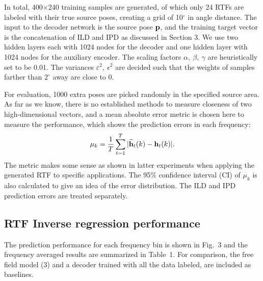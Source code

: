 \documentclass{article}
\begin{document}
In total, 400$\times$240 training samples are generated, of which only 24 RTFs are labeled with their true source poses, creating a grid of 10$^\circ$ in angle distance. The input to the decoder network is the source pose ${\bf p}$, and the training target vector is the concatenation of ILD and IPD as discussed in Section 3. We use two hidden layers each with 1024 nodes for the decoder and one hidden layer with 1024 nodes for the auxiliary encoder. The scaling factors $\alpha,~\beta,~\gamma$ are heuristically set to be 0.01. The variances $\varepsilon^2,~\epsilon^2$ are decided such that the weights of samples farther than $2^\circ$ away are close to 0.

For evaluation, 1000 extra poses are picked randomly in the specified source area. As far as we know, there is no established methods to measure closeness of two high-dimensional vectors, and a mean absolute error metric is chosen here to measure the performance, which shows the prediction errors in each frequency:
\begin{equation}\label{eq:err}
  \mu_k = \frac{1}{T}\sum_{t=1}^{T}|\widehat{\bf h}_t(k)-{\bf h}_t(k)|.
\end{equation}
The metric makes some sense as shown in latter experiments when applying the generated RTF to specific applications. The 95\% confidence interval (CI) of $\mu_k$ is also calculated to give an idea of the error distribution. The ILD and IPD prediction errors are treated separately.

\subsection{RTF Inverse regression performance }

The prediction performance for each frequency bin is shown in Fig.~3 and the frequency averaged results are summarized in Table~1. For comparison, the free field model (3) and a decoder trained with all the data labeled, are included as baselines.
\end{document}
